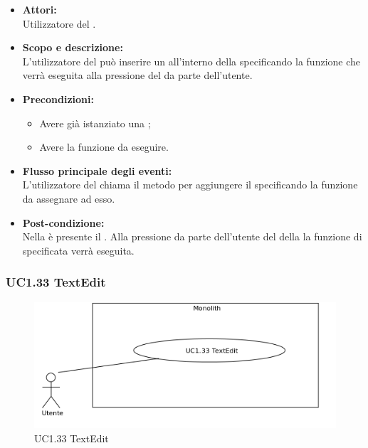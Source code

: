 \begin{itemize}
	\item \textbf{Attori:}
	\\Utilizzatore del .
	\item \textbf{Scopo e descrizione:} 
	\\L'utilizzatore del  può inserire un   all'interno della  specificando la funzione che verrà eseguita alla pressione del  da parte dell'utente.
	\item \textbf{Precondizioni:}
	\begin{itemize}
		\item Avere già istanziato una ;
		\item Avere la funzione da eseguire.
	\end{itemize}
	\item \textbf{Flusso principale degli eventi:}
	\\L'utilizzatore del  chiama il metodo per aggiungere il  specificando la funzione da assegnare ad esso.
	\item \textbf{Post-condizione:}
	\\Nella {} è presente il . Alla pressione da parte dell'utente del  della  la funzione di  specificata verrà eseguita.
\end{itemize}

\subsubsection{UC1.33 TextEdit} \label{UC1.33}

\begin{figure}[H]
	\centering
	\includegraphics[width=15cm]{../../documenti/AnalisiDeiRequisiti/Diagrammi_img/uc1_33.png}
	\caption{UC1.33 TextEdit}
\end{figure}

